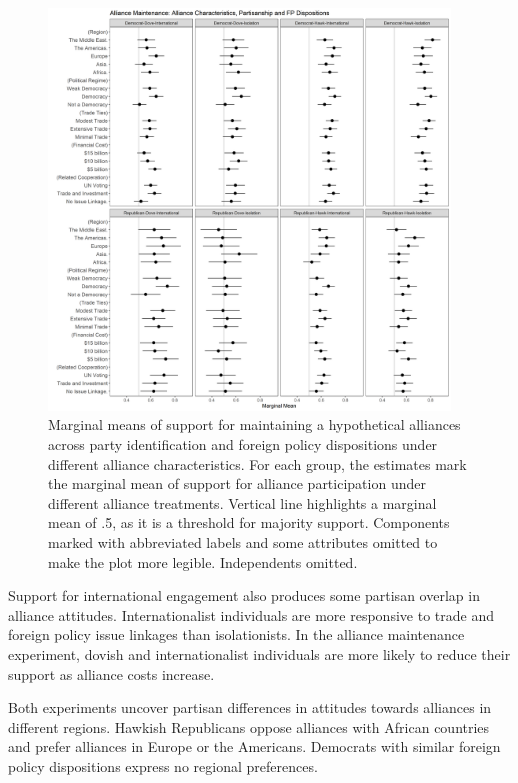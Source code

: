 \documentclass[12pt]{article}
\begin{document}
\begin{figure}
	\centering
		\includegraphics[width=0.95\textwidth]{../figures/party-dispo-main-char.png}
	\caption{Marginal means of support for maintaining a hypothetical alliances across party identification and foreign policy dispositions under different alliance characteristics. For each group, the estimates mark the marginal mean of support for alliance participation under different alliance treatments. Vertical line highlights a marginal mean of .5, as it is a threshold for majority support. Components marked with abbreviated labels and some attributes omitted to make the plot more legible. Independents omitted.}
	\label{fig:party-dispo-main-char}
\end{figure}


Support for international engagement also produces some partisan overlap in alliance attitudes. 
Internationalist individuals are more responsive to trade and foreign policy issue linkages than isolationists. 
In the alliance maintenance experiment, dovish and internationalist individuals are more likely to reduce their support as alliance costs increase.


Both experiments uncover partisan differences in attitudes towards alliances in different regions. 
Hawkish Republicans oppose alliances with African countries and prefer alliances in Europe or the Americans. 
Democrats with similar foreign policy dispositions express no regional preferences.  
\end{document}

